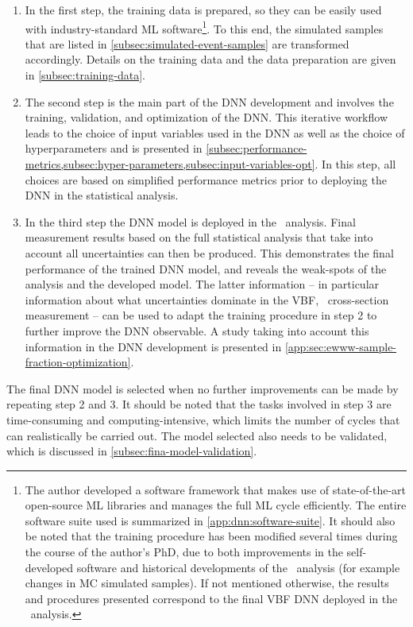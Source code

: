 \begin{enumerate}
    \item In the first step, the training data is prepared, so they can be easily used with industry-standard ML software\footnote{The author developed a software framework that makes use of state-of-the-art open-source ML libraries and manages the full ML cycle efficiently.
    The entire software suite used is summarized in \cref{app:dnn:software-suite}.
    It should also be noted that the training procedure has been modified several times during the course of the author's PhD, due to both improvements in the self-developed software and historical developments of the \HWW\ analysis (for example changes in MC simulated samples). If not mentioned otherwise, the results and procedures presented correspond to the final VBF DNN deployed in the \HWW\ analysis.}. To this end, the simulated samples that are listed in \cref{subsec:simulated-event-samples} are transformed accordingly. Details on the training data and the data preparation are given in \cref{subsec:training-data}.
    \item The second step is the main part of the DNN development and involves the training, validation, and optimization of the DNN.
          This iterative workflow leads to the choice of input variables used in the DNN as well as the choice of hyperparameters and is presented in \cref{subsec:performance-metrics,subsec:hyper-parameters,subsec:input-variables-opt}.
          In this step, all choices are based on simplified performance metrics prior to deploying the DNN in the statistical analysis.
    \item In the third step the DNN model is deployed in the \HWW\ analysis. Final measurement results based on the full statistical analysis that take into account all uncertainties can then be produced. This demonstrates the final performance of the trained DNN model, and reveals the weak-spots of the analysis and the developed model. The latter information -- in particular information about what uncertainties dominate in the VBF, \HWW\ cross-section measurement -- can be used to adapt the training procedure in step 2 to further improve the DNN observable. A study taking into account this information in the DNN development is presented in \cref{app:sec:ewww-sample-fraction-optimization}.
\end{enumerate}
The final DNN model is selected when no further improvements can be made by repeating step 2 and 3. It should be noted that the tasks involved in step 3 are time-consuming and computing-intensive, which limits the number of cycles that can realistically be carried out. 
The model selected also needs to be validated, which is discussed in \cref{subsec:fina-model-validation}.

